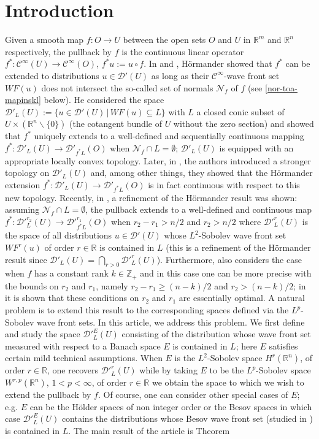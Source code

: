 \documentclass[12pt,reqno]{amsart}
\newcommand{\RR}{\mathbb R}
\newcommand{\ZZ}{\mathbb Z}
\newcommand{\DD}{\mathcal D}
\theoremstyle{plain}
\theoremstyle{remark}
\theoremstyle{definition}
\numberwithin{equation}{section}
\begin{document}
\section{Introduction}


Given a smooth map $f:O\rightarrow U$ between the open sets $O$ and $U$ in $\RR^m$ and $\RR^n$ respectively, the pullback by $f$ is the continuous linear operator $f^*:\mathcal{C}^{\infty}(U)\rightarrow \mathcal{C}^{\infty}(O)$, $f^*u:=u\circ f$. In \cite[Theorem 2.5.11']{hormander} and \cite[Theorem 8.2.4, p. 263]{hor}, H\"ormander showed that $f^*$ can be extended to distributions $u\in\DD'(U)$ as long as their $\mathcal{C}^{\infty}$-wave front set $WF(u)$ does not intersect the so-called set of normals $\mathcal{N}_f$ of $f$ (see \eqref{nor-toa-mapinskl} below). He considered the space $\DD'_L(U):=\{u\in\DD'(U)\,|\, WF(u)\subseteq L\}$ with $L$ a closed conic subset of $U\times(\RR^n\backslash\{0\})$ (the cotangent bundle of $U$ without the zero section) and showed that $f^*$ uniquely extends to a well-defined and sequentially continuous mapping $f^*:\DD'_L(U)\rightarrow \DD'_{f^*L}(O)$ when $\mathcal{N}_f\cap L=\emptyset$; $\DD'_L(U)$ is equipped with an appropriate locally convex topology. Later, in \cite{D1,DB}, the authors introduced a stronger topology on $\DD'_L(U)$ and, among other things, they showed that the H\"ormander extension $f^*:\DD'_L(U)\rightarrow \DD'_{f^*L}(O)$ is in fact continuous with respect to this new topology. Recently, in \cite[Theorem 3.21]{PP}, a refinement of the H\"ormander result was shown: assuming $\mathcal{N}_f\cap L=\emptyset$, the pullback extends to a well-defined and continuous map $f^*:\DD'^{r_2}_L(U)\rightarrow \DD'^{r_1}_{f^*L}(O)$ when $r_2-r_1>n/2$ and $r_2>n/2$ where $\DD'^r_L(U)$ is the space of all distributions $u\in\DD'(U)$ whose $L^2$-Sobolev wave front set $WF^r(u)$ of order $r\in\RR$ is contained in $L$ (this is a refinement of the H\"ormander result since $\DD'_L(U)=\bigcap_{r>0}\DD'^r_L(U)$). Furthermore, \cite[Theorem 3.21]{PP} also considers the case when $f$ has a constant rank $k\in\ZZ_+$ and in this case one can be more precise with the bounds on $r_2$ and $r_1$, namely $r_2-r_1\geq(n-k)/2$ and $r_2> (n-k)/2$; in \cite[Appendix A]{PP} it is shown that these conditions on $r_2$ and $r_1$ are essentially optimal. A natural problem is to extend this result to the corresponding spaces defined via the $L^p$-Sobolev wave front sets. In this article, we address this problem. We first define and study the space $\DD'^E_L(U)$ consisting of the distribution whose wave front set measured with respect to a Banach space $E$ is contained in $L$; here $E$ satisfies certain mild technical assumptions. When $E$ is the $L^2$-Sobolev space $H^r(\RR^n)$, of order $r\in\RR$, one recovers $\DD'^r_L(U)$ while by taking $E$ to be the $L^p$-Sobolev space $W^{r,p}(\RR^n)$, $1<p<\infty$, of order $r\in\RR$ we obtain the space to which we wish to extend the pullback by $f$. Of course, one can consider other special cases of $E$; e.g. $E$ can be the H\"older spaces of non integer order or the Besov spaces in which case $\DD'^E_L(U)$ contains the distributions whose Besov wave front set (studied in \cite{dap-r-scl}) is contained in $L$. The main result of the article is Theorem 
\end{document}
